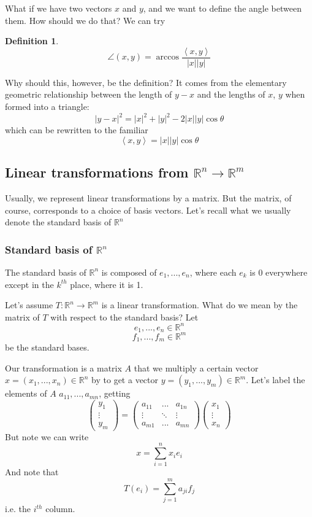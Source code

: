 \documentclass{article}
\newtheorem{definition}{Definition}
\newcommand{\reals}[0]{\mathbb{R}}
\newcommand{\ip}[2]{\left\langle#1,#2\right\rangle}
\begin{document}
What if we have two vectors \(x\) and \(y\), and we want to define the angle between them. How should we do that? We can try

\begin{definition}
\[\angle(x, y) = \arccos\frac{\ip{x}{y}}{|x||y|}\]
\end{definition}
Why should this, however, be the definition? It comes from the elementary geometric relationship between the length of \(y - x\) and the lengths of \(x\), \(y\) when formed into a triangle:
\[|y - x|^2 = |x|^2 + |y|^2 - 2|x||y|\cos\theta\]
which can be rewritten to the familiar
\[\ip{x}{y} = |x||y|\cos\theta\]

\subsection*{Linear transformations from \(\reals^n \to \reals^m\)}

Usually, we represent linear transformations by a matrix. But the matrix, of course, corresponds to a choice of basis vectors. Let's recall what we usually denote the standard basis of \(\reals^n\)

\subsubsection*{Standard basis of \(\reals^n\)}

The standard basis of \(\reals^n\) is composed of \(e_1,...,e_n\), where each \(e_k\) is 0 everywhere except in the \(k^{th}\) place, where it is 1.

Let's assume \(T: \reals^n \to \reals^m\) is a linear transformation. What do we mean by the matrix of \(T\) with respect to the standard basis? Let
\[e_1,...,e_n \in \reals^n\]
\[f_1,...,f_m \in \reals^m\]
be the standard bases.

Our transformation is a matrix \(A\) that we multiply a certain vector \(x = (x_1,...,x_n) \in \reals^n\) by to get a vector \(y = (y_1,...,y_m) \in \reals^m\). Let's label the elements of \(A\) \(a_{11},...,a_{mn}\), getting
\[\begin{pmatrix} y_1 \\ \vdots \\ y_m \end{pmatrix} =
\begin{pmatrix}
  a_{11} & ... & a_{1n} \\
  \vdots & \ddots & \vdots \\
  a_{m1} & ... & a_{mn}
\end{pmatrix}\begin{pmatrix}
  x_1 \\ \vdots \\ x_n
\end{pmatrix}\]
But note we can write
\[x = \sum_{i = 1}^nx_ie_i\]
And note that
\[T(e_i) = \sum_{j = 1}^ma_{ji}f_j\]
i.e. the \(i^{th}\) column.
\end{document}
